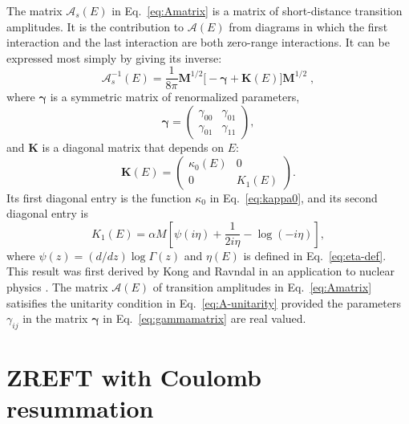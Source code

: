 \documentclass[%
 reprint,
 amsmath,amssymb,
 aps,
]{revtex4-1}
\begin{document}
The matrix  $\bm{\mathcal{A}}_s(E)$ in Eq.~\eqref{eq:Amatrix} is a matrix of short-distance transition amplitudes.
It is the contribution to $\bm{\mathcal{A}}(E)$ from diagrams in which the first interaction and the last interaction are both zero-range interactions.
It can be expressed most simply by giving its inverse:
\begin{equation}
\label{eq:Ainverse0C}
\bm{\mathcal{A}}_s^{-1}(E) = \frac{1}{8\pi} \bm{M}^{1/2}
\Big[ - \bm{\gamma} + \bm{K}(E) \Big] \bm{M}^{1/2} \;,
\end{equation}
where  $\bm{\gamma}$ is a symmetric matrix of renormalized parameters,
\begin{equation}
\label{eq:gammamatrix}
\bm{\gamma}= 
\begin{pmatrix} \gamma_{00}   & \gamma_{01} \\ 
 \gamma_{01} & \gamma_{11} 
\end{pmatrix},
\end{equation}
and $\bm{K}$ is a diagonal matrix that depends on $E$:
\begin{equation}
\bm{K}(E) =
\begin{pmatrix} \kappa_0(E)  &          0       \\ 
                                 0            & K_1(E)
\end{pmatrix} .
\label{eq:Kmatrix}
\end{equation}
Its first diagonal entry is the function $\kappa_0$ in Eq.~\eqref{eq:kappa0}, and its second diagonal entry is
\begin{equation}
K_1(E) =\alpha M \left[ \psi(i \eta) + \frac{1}{2 i \eta} - \log(-i\eta)  \right],
\label{eq:K1-E}
\end{equation}
where $\psi(z)=(d/dz)\log \Gamma(z)$ and $\eta(E)$ is defined in Eq.~\eqref{eq:eta-def}.
This result was first derived by Kong and Ravndal in an application to nuclear physics \cite{Kong:1999sf}.
The matrix $\bm{\mathcal{A}}(E)$ of transition amplitudes in Eq.~\eqref{eq:Amatrix} satisifies the unitarity condition in Eq.~\eqref{eq:A-unitarity} provided the parameters $\gamma_{ij}$ in the matrix $\bm{\gamma}$ in Eq.~\eqref{eq:gammamatrix} are real valued.


\section{ZREFT with Coulomb resummation}
\label{sec:ZREFTC}
\end{document}
